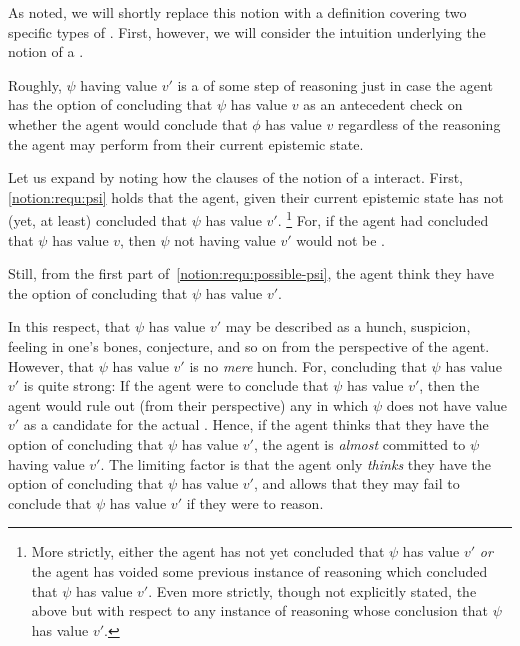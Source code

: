 \begin{note}
  As noted, we will shortly replace this notion with a definition covering two specific types of \requ{}.
  First, however, we will consider the intuition underlying the notion of a \requ{}.

  Roughly, \(\psi\) having value \(v'\) is a \requ{} of some step of reasoning just in case the agent has the option of concluding that \(\psi\) has value \(v\) as an antecedent check on whether the agent would conclude that \(\phi\) has value \(v\) regardless of the reasoning the agent may perform from their current epistemic state.
\end{note}

\begin{note}[Expanding]
  Let us expand by noting how the clauses of the notion of a \requ{} interact.
  First, \ref{notion:requ:psi} holds that the agent, given their current epistemic state has not (yet, at least) concluded that \(\psi\) has value \(v'\).\nolinebreak
  \footnote{
    More strictly, either the agent has not yet concluded that \(\psi\) has value \(v'\) \emph{or} the agent has voided some previous instance of reasoning which concluded that \(\psi\) has value \(v'\).
    Even more strictly, though not explicitly stated, the above but with respect to any instance of reasoning whose conclusion \indicateV{} that \(\psi\) has value \(v'\).
  }
  For, if the agent had concluded that \(\psi\) has value \(v\), then \(\psi\) not having value \(v'\) would not be \epVAd{}.

  Still, from the first part of~\ref{notion:requ:possible-psi}, the agent think they have the option of concluding that \(\psi\) has value \(v'\).

  In this respect, that \(\psi\) has value \(v'\) may be described as a hunch, suspicion, feeling in one's bones, conjecture, and so on from the perspective of the agent.
  However, that \(\psi\) has value \(v'\) is no \emph{mere} hunch.
  For, concluding that \(\psi\) has value \(v'\) is quite strong:
  If the agent were to conclude that \(\psi\) has value \(v'\), then the agent would rule out (from their perspective) any \world{} in which \(\psi\) does not have value \(v'\) as a candidate for the actual \world{}.
  Hence, if the agent thinks that they have the option of concluding that \(\psi\) has value \(v'\), the agent is \emph{almost} committed to \(\psi\) having value \(v'\).
  The limiting factor is that the agent only \emph{thinks} they have the option of concluding that \(\psi\) has value \(v'\), and allows that they may fail to conclude that \(\psi\) has value \(v'\) if they were to reason.


\end{note}
